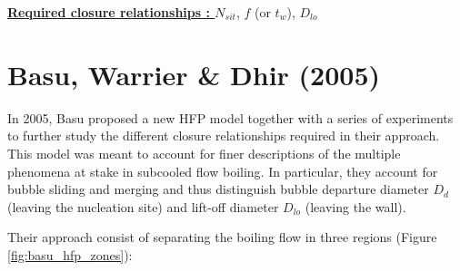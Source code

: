 \textbf{\underline{Required closure relationships : }} $N_{sit}$, $f$ (or $t_{w}$), $D_{lo}$ 


\section{Basu, Warrier \& Dhir (2005)}
\label{sec:hfp_basu}

In 2005, Basu \etal \cite{basu_wall_2005, basu_wall_2005-1} proposed a new HFP model together with a series of experiments to further study the different closure relationships required in their approach. This model was meant to account for finer descriptions of the multiple phenomena at stake in subcooled flow boiling. In particular, they account for bubble sliding and merging and thus distinguish bubble departure diameter $D_{d}$ (leaving the nucleation site) and lift-off diameter $D_{lo}$ (leaving the wall).

\npar
Their approach consist of separating the boiling flow in three regions (Figure \ref{fig:basu_hfp_zones}):

